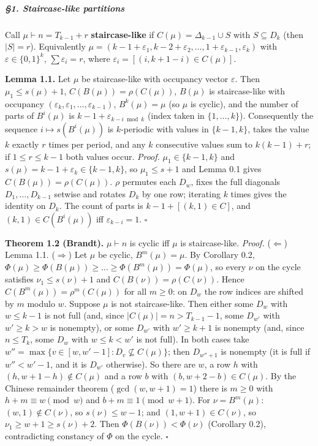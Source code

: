 \subparagraph{§1. Staircase-like
partitions}\label{staircase-like-partitions}

Call \(\mu\vdash n=T_{k-1}+r\) \textbf{staircase-like} if
\(C(\mu)=\Delta_{k-1}\cup S\) with \(S\subseteq D_k\) (then \(|S|=r\)).
Equivalently
\(\mu=(k-1+\varepsilon_1,k-2+\varepsilon_2,\dots,1+\varepsilon_{k-1},\varepsilon_k)\)
with \(\varepsilon\in\{0,1\}^k\), \(\sum\varepsilon_i=r\), where
\(\varepsilon_i=[(i,k+1-i)\in C(\mu)]\).

\textbf{Lemma 1.1.} Let \(\mu\) be staircase-like with occupancy vector
\(\varepsilon\). Then \(\mu_1\le s(\mu)+1\), \(C(B(\mu))=\rho(C(\mu))\),
\(B(\mu)\) is staircase-like with occupancy
\((\varepsilon_k,\varepsilon_1,\dots,\varepsilon_{k-1})\),
\(B^k(\mu)=\mu\) (so \(\mu\) is cyclic), and the number of parts of
\(B^i(\mu)\) is \(k-1+\varepsilon_{k-i \bmod k}\) (index taken in
\(\{1,\dots,k\}\)). Consequently the sequence \(i\mapsto s(B^i(\mu))\)
is \(k\)-periodic with values in \(\{k-1,k\}\), takes the value \(k\)
exactly \(r\) times per period, and any \(k\) consecutive values sum to
\(k(k-1)+r\); if \(1\le r\le k-1\) both values occur. \emph{Proof.}
\(\mu_1\in\{k-1,k\}\) and \(s(\mu)=k-1+\varepsilon_k\in\{k-1,k\}\), so
\(\mu_1\le s+1\) and Lemma 0.1 gives \(C(B(\mu))=\rho(C(\mu))\).
\(\rho\) permutes each \(D_w\), fixes the full diagonals
\(D_1,\dots,D_{k-1}\) setwise and rotates \(D_k\) by one row; iterating
\(k\) times gives the identity on \(D_k\). The count of parts is
\(k-1+[(k,1)\in C]\), and \((k,1)\in C(B^i(\mu))\) iff
\(\varepsilon_{k-i}=1\). \(\square\)

\textbf{Theorem 1.2 (Brandt).} \(\mu\vdash n\) is cyclic iff \(\mu\) is
staircase-like. \emph{Proof.} (\(\Leftarrow\)) Lemma 1.1.
(\(\Rightarrow\)) Let \(\mu\) be cyclic, \(B^m(\mu)=\mu\). By Corollary
0.2, \(\Phi(\mu)\ge\Phi(B(\mu))\ge\dots\ge\Phi(B^m(\mu))=\Phi(\mu)\), so
every \(\nu\) on the cycle satisfies \(\nu_1\le s(\nu)+1\) and
\(C(B(\nu))=\rho(C(\nu))\). Hence \(C(B^m(\mu))=\rho^m(C(\mu))\) for all
\(m\ge0\): on \(D_w\) the row indices are shifted by \(m\) modulo \(w\).
Suppose \(\mu\) is not staircase-like. Then either some \(D_w\) with
\(w\le k-1\) is not full (and, since \(|C(\mu)|=n>T_{k-1}-1\), some
\(D_{w'}\) with \(w'\ge k>w\) is nonempty), or some \(D_{w'}\) with
\(w'\ge k+1\) is nonempty (and, since \(n\le T_k\), some \(D_w\) with
\(w\le k<w'\) is not full). In both cases take
\(w''=\max\{v\in[w,w'-1]:D_v\not\subseteq C(\mu)\}\); then \(D_{w''+1}\)
is nonempty (it is full if \(w''<w'-1\), and it is \(D_{w'}\)
otherwise). So there are \(w\), a row \(h\) with
\((h,w+1-h)\notin C(\mu)\) and a row \(b\) with \((b,w+2-b)\in C(\mu)\).
By the Chinese remainder theorem (\(\gcd(w,w+1)=1\)) there is \(m\ge0\)
with \(h+m\equiv w\pmod w\) and \(b+m\equiv1\pmod{w+1}\). For
\(\nu=B^m(\mu)\): \((w,1)\notin C(\nu)\), so \(s(\nu)\le w-1\); and
\((1,w+1)\in C(\nu)\), so \(\nu_1\ge w+1\ge s(\nu)+2\). Then
\(\Phi(B(\nu))<\Phi(\nu)\) (Corollary 0.2), contradicting constancy of
\(\Phi\) on the cycle. \(\square\)


